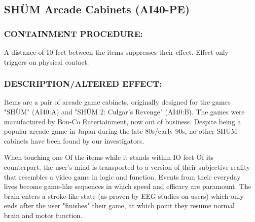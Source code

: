 \subsection*{SHÜM Arcade Cabinets (AI40-PE)}
\subsubsection*{CONTAINMENT PROCEDURE:}
\par A distance of 10 feet between the items
suppresses their effect. Effect only
triggers on physical contact.
\subsubsection*{DESCRIPTION/ALTERED EFFECT:}
\par Items are a pair of arcade game
cabinets, originally designed for the
games "SHÜM" (AI40:A) and "SHÜM 2:
Culgar's Revenge" (AI40:B). The games were manufactured by
Bon-Co Entertainment, now out of business. Despite being a
popular arcade game in Japan during the late 80s/early 90s, no
other SHUM cabinets have been found by our investigators.
\par When touching one Of the items while it stands within IO feet Of
its counterpart, the user's mind is transported to a version of their
subjective reality that resembles a video game in logic and
function. Events from their everyday lives become game-like
sequences in which speed and efficacy are paramount. The brain
enters a stroke-like state (as proven by EEG studies on users)
which only ends after the user "finishes" their game, at which
point they resume normal brain and motor function.